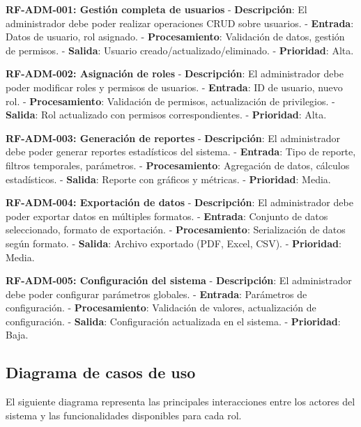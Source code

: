 \documentclass[12pt,a4paper,oneside]{report}
\begin{document}
\textbf{RF-ADM-001: Gestión completa de usuarios} -
\textbf{Descripción}: El administrador debe poder realizar operaciones
CRUD sobre usuarios. - \textbf{Entrada}: Datos de usuario, rol asignado.
- \textbf{Procesamiento}: Validación de datos, gestión de permisos. -
\textbf{Salida}: Usuario creado/actualizado/eliminado. -
\textbf{Prioridad}: Alta.

\textbf{RF-ADM-002: Asignación de roles} - \textbf{Descripción}: El
administrador debe poder modificar roles y permisos de usuarios. -
\textbf{Entrada}: ID de usuario, nuevo rol. - \textbf{Procesamiento}:
Validación de permisos, actualización de privilegios. - \textbf{Salida}:
Rol actualizado con permisos correspondientes. - \textbf{Prioridad}:
Alta.

\textbf{RF-ADM-003: Generación de reportes} - \textbf{Descripción}: El
administrador debe poder generar reportes estadísticos del sistema. -
\textbf{Entrada}: Tipo de reporte, filtros temporales, parámetros. -
\textbf{Procesamiento}: Agregación de datos, cálculos estadísticos. -
\textbf{Salida}: Reporte con gráficos y métricas. - \textbf{Prioridad}:
Media.

\textbf{RF-ADM-004: Exportación de datos} - \textbf{Descripción}: El
administrador debe poder exportar datos en múltiples formatos. -
\textbf{Entrada}: Conjunto de datos seleccionado, formato de
exportación. - \textbf{Procesamiento}: Serialización de datos según
formato. - \textbf{Salida}: Archivo exportado (PDF, Excel, CSV). -
\textbf{Prioridad}: Media.

\textbf{RF-ADM-005: Configuración del sistema} - \textbf{Descripción}:
El administrador debe poder configurar parámetros globales. -
\textbf{Entrada}: Parámetros de configuración. - \textbf{Procesamiento}:
Validación de valores, actualización de configuración. -
\textbf{Salida}: Configuración actualizada en el sistema. -
\textbf{Prioridad}: Baja.

\subsection{Diagrama de casos de uso}\label{diagrama-de-casos-de-uso}

El siguiente diagrama representa las principales interacciones entre los
actores del sistema y las funcionalidades disponibles para cada rol.
\end{document}
